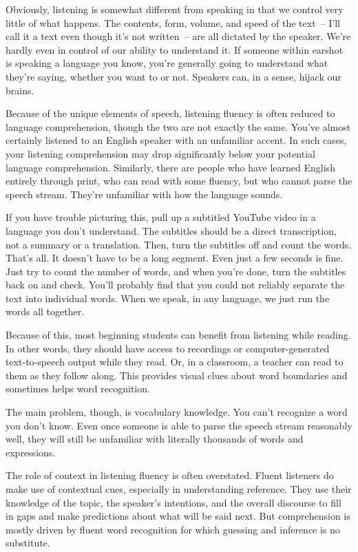 Obviously, listening is somewhat different from speaking in that we control very little of what happens. The contents, form, volume, and speed of the text~-- I'll call it a text even though it's not written~-- are all dictated by the speaker. We're hardly even in control of our ability to understand it. If someone within earshot is speaking a language you know, you're generally going to understand what they're saying, whether you want to or not. Speakers can, in a sense, hijack our brains.

Because of the unique elements of speech, listening fluency is often reduced to language comprehension, though the two are not exactly the same. You've almost certainly listened to an English speaker with an unfamiliar accent. In such cases, your listening comprehension may drop significantly below your potential language comprehension. Similarly, there are people who have learned English entirely through print, who can read with some fluency, but who cannot parse the speech stream. They're unfamiliar with how the language sounds.

If you have trouble picturing this, pull up a subtitled YouTube video in a language you don't understand. The subtitles should be a direct transcription, not a summary or a translation. Then, turn the subtitles off and count the words. That's all. It doesn't have to be a long segment. Even just a few seconds is fine. Just try to count the number of words, and when you're done, turn the subtitles back on and check. You'll probably find that you could not reliably separate the text into individual words. When we speak, in any language, we just run the words all together.

Because of this, most beginning students can benefit from listening while reading. In other words, they should have access to recordings or computer-generated text-to-speech output while they read. Or, in a classroom, a teacher can read to them as they follow along. This provides visual clues about word boundaries and sometimes helps word recognition.

The main problem, though, is vocabulary knowledge. You can't recognize a word you don't know. Even once someone is able to parse the speech stream reasonably well, they will still be unfamiliar with literally thousands of words and expressions. 

The role of context in listening fluency is often overstated. Fluent listeners do make use of contextual cues, especially in understanding reference. They use their knowledge of the topic, the speaker's intentions, and the overall discourse to fill in gaps and make predictions about what will be said next. But comprehension is mostly driven by fluent word recognition for which guessing and inference is no substitute.

